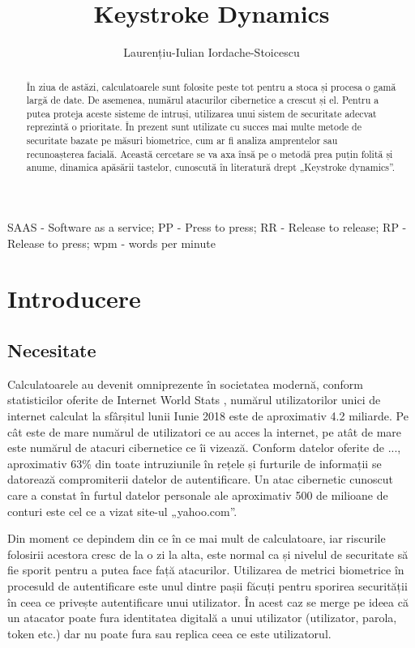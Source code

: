 \documentclass[9pt,shortpaper,twoside,web]{ieeecolor}
\begin{document}
\title{Keystroke Dynamics}
\author{Laurențiu-Iulian Iordache-Stoicescu }

\maketitle


\begin{abstract}
În ziua de astăzi, calculatoarele sunt folosite peste tot pentru a stoca și procesa o gamă largă de date. De asemenea, numărul atacurilor cibernetice a crescut și el. Pentru a putea proteja aceste sisteme de intruși, utilizarea unui sistem de securitate adecvat reprezintă o prioritate. În prezent sunt utilizate cu succes mai multe metode de securitate bazate pe măsuri biometrice, cum ar fi analiza amprentelor sau recunoașterea facială. Această cercetare se va axa însă pe o metodă prea puțin folită și anume, dinamica apăsării tastelor, cunoscută în literatură drept „Keystroke dynamics”.
\end{abstract}

\begin{IEEEkeywords}
SAAS - Software as a service;
PP - Press to press; 
RR - Release to release; 
RP - Release to press;
wpm - words per minute
\end{IEEEkeywords}


\section{Introducere}
\label{sec:introduction}


\subsection{Necesitate}
	Calculatoarele au devenit omniprezente în societatea modernă, conform statisticilor oferite de Internet World Stats \cite{b1}, numărul utilizatorilor unici de internet calculat la sfârșitul lunii Iunie 2018 este de aproximativ 4.2 miliarde. Pe cât este de mare numărul de utilizatori ce au acces la internet, pe atât de mare este numărul de atacuri cibernetice ce îi vizează. Conform datelor oferite de ..., aproximativ 63\% din toate intruziunile în rețele și furturile de informații se datorează compromiterii datelor de autentificare. Un atac cibernetic cunoscut care a constat în furtul datelor personale ale aproximativ 500 de milioane de conturi este cel ce a vizat site-ul „yahoo.com”.

	Din moment ce depindem din ce în ce mai mult de calculatoare, iar riscurile folosirii acestora cresc de la o zi la alta, este normal ca și nivelul de securitate să fie sporit pentru a putea face față atacurilor. Utilizarea de metrici biometrice în procesuld de autentificare este unul dintre pașii făcuți pentru sporirea securității în ceea ce privește autentificare unui utilizator. În acest caz se merge pe ideea că un atacator poate fura identitatea digitală a unui utilizator (utilizator, parola, token etc.) dar nu poate fura sau replica ceea ce este utilizatorul.
\end{document}
